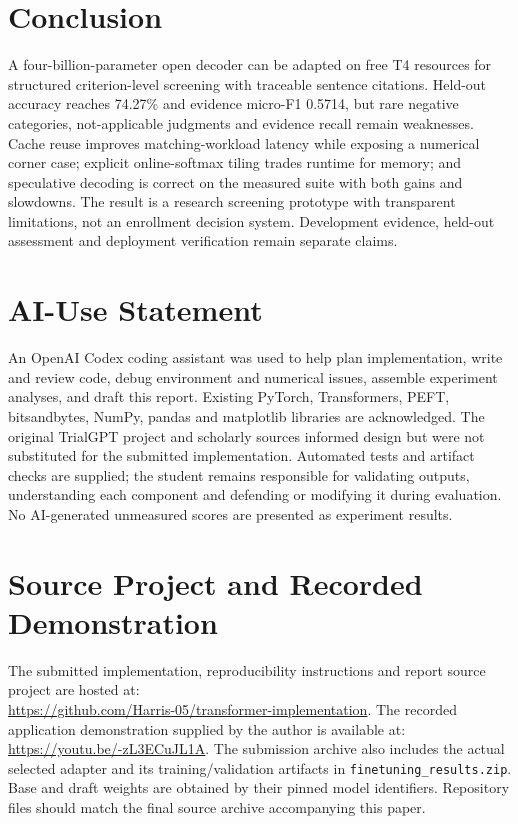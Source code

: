 \documentclass[conference]{IEEEtran}
\newcommand{\code}[1]{\texttt{#1}}
\begin{document}
\section{Conclusion}
A four-billion-parameter open decoder can be adapted on free T4 resources for structured criterion-level screening with traceable sentence citations. Held-out accuracy reaches 74.27\% and evidence micro-F1 0.5714, but rare negative categories, not-applicable judgments and evidence recall remain weaknesses. Cache reuse improves matching-workload latency while exposing a numerical corner case; explicit online-softmax tiling trades runtime for memory; and speculative decoding is correct on the measured suite with both gains and slowdowns. The result is a research screening prototype with transparent limitations, not an enrollment decision system. Development evidence, held-out assessment and deployment verification remain separate claims.

\appendices
\section{AI-Use Statement}
An OpenAI Codex coding assistant was used to help plan implementation, write and review code, debug environment and numerical issues, assemble experiment analyses, and draft this report. Existing PyTorch, Transformers, PEFT, bitsandbytes, NumPy, pandas and matplotlib libraries are acknowledged. The original TrialGPT project and scholarly sources informed design but were not substituted for the submitted implementation. Automated tests and artifact checks are supplied; the student remains responsible for validating outputs, understanding each component and defending or modifying it during evaluation. No AI-generated unmeasured scores are presented as experiment results.

\section{Source Project and Recorded Demonstration}
The submitted implementation, reproducibility instructions and report source project are hosted at:\\
\url{https://github.com/Harris-05/transformer-implementation}.
The recorded application demonstration supplied by the author is available at:\\
\url{https://youtu.be/-zL3ECuJL1A}.
The submission archive also includes the actual selected adapter and its training/validation artifacts in \code{finetuning\_results.zip}. Base and draft weights are obtained by their pinned model identifiers. Repository files should match the final source archive accompanying this paper.
\end{document}
